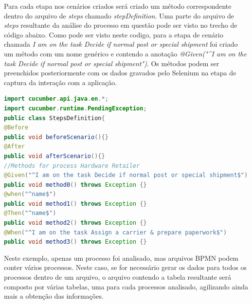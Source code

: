 \documentclass[12pt]{article}
\begin{document}


Para cada etapa nos cenários criados será criado um método correspondente dentro do arquivo de \emph{steps} chamado \emph{stepDefinition}. Uma parte do arquivo de \emph{steps} resultante da análise do processo em questão pode ser visto no trecho de código abaixo. Como pode ser visto neste codigo, para a etapa de cenário chamada \emph{I am on the task Decide if normal post or special shipment} foi criado um método com um nome genérico e contendo a anotação \emph{@Given("\^{}I am on the task Decide if normal post or special shipment\textdollar{}")}. Os métodos podem ser preenchidos posteriormente com os dados gravados pelo Selenium na etapa de captura da interação com a aplicação.

\begin{lstlisting}[language=Java]
import cucumber.api.java.en.*;
import cucumber.runtime.PendingException;
public class StepsDefinition{
@Before
public void beforeScenario(){}
@After
public void afterScenario(){} 
//Methods for process Hardware Retailer
@Given("^I am on the task Decide if normal post or special shipment$") 
public void method0() throws Exception {} 
@when("^name$") 
public void method1() throws Exception {} 
@Then("^name$") 
public void method2() throws Exception {} 
@When("^I am on the task Assign a carrier & prepare paperwork$") 
public void method3() throws Exception {} 
\end{lstlisting}




Neste exemplo, apenas um processo foi analisado, mas arquivos BPMN podem conter vários processos. Neste caso, se for necessário gerar os dados para todos os processos dentro de um arquivo, o arquivo contendo a tabela resultante será composto por várias tabelas, uma para cada processos analisado, agilizando ainda mais a obtenção das informações. 
\end{document}
